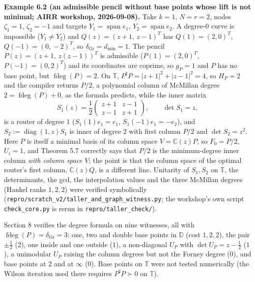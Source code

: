 \documentclass[
  11pt,
  a4paper,
]{article}
\begin{document}
\textbf{Example 6.2 (an admissible pencil without base points whose lift
is not minimal; AIRR workshop, 2026-09-08).} Take \(k=1\), \(N=r=2\),
nodes \(\zeta_1=1\), \(\zeta_2=-1\) and targets
\(Y_1=\operatorname{span}e_1\), \(Y_2=\operatorname{span}e_2\). A
degree-\(0\) curve is impossible (\(Y_1\ne Y_2\)) and
\(Q(z)=(z+1,\allowbreak{}\ z-1)^T\) has \(Q(1)=(2,\allowbreak{}0)^T\), \(Q(-1)=(0,\allowbreak{}-2)^T\), so
\(\delta_{\mathrm{Gr}}=d_{\min}=1\). The pencil
\(P(z)=(z+1,\allowbreak{}\ z(z-1))^T\) is admissible (\(P(1)=(2,\allowbreak{}0)^T\),
\(P(-1)=(0,\allowbreak{}2)^T\)) and its coordinates are coprime, so \(g_P=1\) and
\(P\) has no base point, but \(\operatorname{fdeg}(P)=2\). On
\(\mathbb T\), \(P^\sharp P=|z+1|^2+|z-1|^2=4\), so \(H_P=2\) and the
compiler returns \(P/2\), a polynomial column of McMillan degree
\(2=\operatorname{fdeg}(P)+0\), as the formula predicts, while the inner
matrix
\[S_1(z)=\frac12\begin{pmatrix}z+1&z-1\\ z-1&z+1\end{pmatrix},\qquad\det S_1=z,\]
is a router of degree \(1\) (\(S_1(1)e_1=e_1\), \(S_1(-1)e_1=-e_2\)),
and \(S_2:=\operatorname{diag}(1,\allowbreak{}z)S_1\) is inner of degree \(2\) with
first column \(P/2\) and \(\det S_2=z^2\). Here \(P\) is itself a
minimal basis of its column space \(V=\mathbb C(z)P\), so \(F_0=P/2\),
\(U_i=1\), and Theorem 5.7 correctly says that \(P/2\) is the
minimum-degree inner column \emph{with column space \(V\)}; the point is
that the column space of the optimal router's first column,
\(\mathbb C(z)Q\), is a different line. Unitarity of \(S_1,\allowbreak{}S_2\) on
\(\mathbb T\), the determinants, the gcd, the interpolation values and
the three McMillan degrees (Hankel ranks \(1,\allowbreak{}2,\allowbreak{}2\)) were verified
symbolically ({\small\texttt{repro/\allowbreak{}scratch\_\allowbreak{}v2/\allowbreak{}taller\_\allowbreak{}and\_\allowbreak{}graph\_\allowbreak{}witness.\allowbreak{}py}};
the workshop's own script {\small\texttt{check\_\allowbreak{}core.\allowbreak{}py}} is rerun in
{\small\texttt{repro/\allowbreak{}taller\_\allowbreak{}check/\allowbreak{}}}).

Section 8 verifies the degree formula on nine witnesses, all with
\(\operatorname{fdeg}(P)=\delta_{\mathrm{Gr}}=3\): one, two and double
base points in \(\mathbb D\) (cost \(1,\allowbreak{}2,\allowbreak{}2\)), the pair \(\pm\tfrac12\)
(\(2\)), one inside and one outside (\(1\)), a non-diagonal \(U_P\) with
\(\det U_P=z-\tfrac12\) (\(1\)), a unimodular \(U_P\) raising the column
degrees but not the Forney degree (\(0\)), and base points at \(2\) and
at \(\infty\) (\(0\)). Base points on \(\mathbb T\) were not tested
numerically (the Wilson iteration used there requires
\(P^\sharp P\succ0\) on \(\mathbb T\)).
\end{document}
